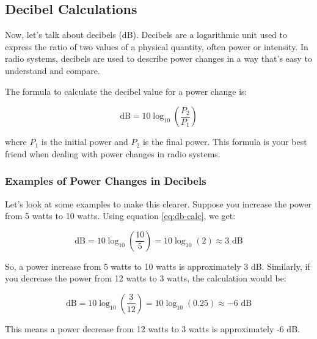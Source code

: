 \subsection{Decibel Calculations}
\label{subsec:power-db}

Now, let's talk about decibels (dB). Decibels are a logarithmic unit used to express the ratio of two values of a physical quantity, often power or intensity. In radio systems, decibels are used to describe power changes in a way that's easy to understand and compare.

The formula to calculate the decibel value for a power change is:

\begin{equation}
\text{dB} = 10 \log_{10}\left(\frac{P_2}{P_1}\right)
\label{eq:db-calc}
\end{equation}

where \(P_1\) is the initial power and \(P_2\) is the final power. This formula is your best friend when dealing with power changes in radio systems.

\subsubsection*{Examples of Power Changes in Decibels}
Let's look at some examples to make this clearer. Suppose you increase the power from 5 watts to 10 watts. Using equation \ref{eq:db-calc}, we get:

\[
\text{dB} = 10 \log_{10}\left(\frac{10}{5}\right) = 10 \log_{10}(2) \approx 3 \text{ dB}
\]

So, a power increase from 5 watts to 10 watts is approximately 3 dB. Similarly, if you decrease the power from 12 watts to 3 watts, the calculation would be:

\[
\text{dB} = 10 \log_{10}\left(\frac{3}{12}\right) = 10 \log_{10}(0.25) \approx -6 \text{ dB}
\]

This means a power decrease from 12 watts to 3 watts is approximately -6 dB.

